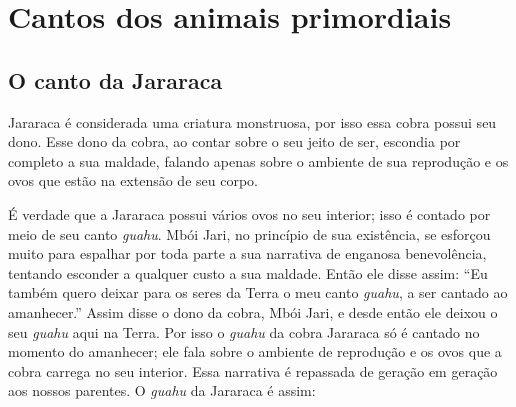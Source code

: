 
\part{Cantos dos animais primordiais}%

\chapter*{}
\thispagestyle{empty}
\vspace*{\fill}
\emph{}
\vspace*{\fill}

\chapter{O canto da Jararaca}

Jararaca é considerada uma criatura monstruosa, por isso essa cobra
possui seu dono. Esse dono da cobra, ao contar sobre o seu jeito de ser,
escondia por completo a sua maldade, falando apenas sobre o ambiente de
sua reprodução e os ovos que estão na extensão de seu corpo.

É verdade que a Jararaca possui vários ovos no seu interior; isso é
contado por meio de seu canto \emph{guahu}. Mbói Jari, no princípio de
sua existência, se esforçou muito para espalhar por toda parte a sua
narrativa de enganosa benevolência, tentando esconder a qualquer custo a
sua maldade. Então ele disse assim: ``Eu também quero deixar para os
seres da Terra o meu canto \emph{guahu}, a ser cantado ao amanhecer.''
Assim disse o dono da cobra, Mbói Jari, e desde então ele deixou o seu
\emph{guahu} aqui na Terra. Por isso o \emph{guahu} da cobra Jararaca só
é cantado no momento do amanhecer; ele fala sobre o ambiente de
reprodução e os ovos que a cobra carrega no seu interior. Essa narrativa
é repassada de geração em geração aos nossos parentes. O \emph{guahu} da
Jararaca é assim:

